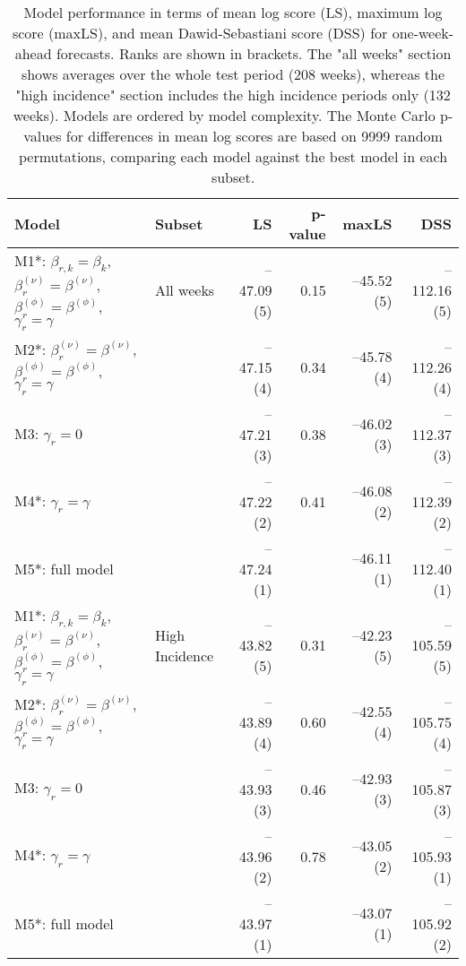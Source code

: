 \begin{table}[ht]
\centering
\begingroup\fontsize{9pt}{10pt}\selectfont
\begin{tabular}{ll|rrrr}
  \hline
Model & Subset & LS & p-value & maxLS & DSS \\ 
  \hline
M1*: $\beta_{r,k} = \beta_{k}$, $\beta_{r}^{(\nu)} = \beta^{(\nu)}$, $\beta_r^{(\phi)} = \beta^{(\phi)}$, $\gamma_r = \gamma$ & All weeks & --47.09 (5) & 0.15 & --45.52 (5) & --112.16 (5) \\ 
  M2*: $\beta_{r}^{(\nu)} = \beta^{(\nu)}$, $\beta_r^{(\phi)} = \beta^{(\phi)}$, $\gamma_r = \gamma$ &  & --47.15 (4) & 0.34 & --45.78 (4) & --112.26 (4) \\ 
  M3: $\gamma_r = 0$ &  & --47.21 (3) & 0.38 & --46.02 (3) & --112.37 (3) \\ 
  M4*: $\gamma_r = \gamma$ &  & --47.22 (2) & 0.41 & --46.08 (2) & --112.39 (2) \\ 
  M5*: full model &  & --47.24 (1) &  & --46.11 (1) & --112.40 (1) \\ 
   \hline
M1*: $\beta_{r,k} = \beta_{k}$, $\beta_{r}^{(\nu)} = \beta^{(\nu)}$, $\beta_r^{(\phi)} = \beta^{(\phi)}$, $\gamma_r = \gamma$ & High Incidence & --43.82 (5) & 0.31 & --42.23 (5) & --105.59 (5) \\ 
  M2*: $\beta_{r}^{(\nu)} = \beta^{(\nu)}$, $\beta_r^{(\phi)} = \beta^{(\phi)}$, $\gamma_r = \gamma$ &  & --43.89 (4) & 0.60 & --42.55 (4) & --105.75 (4) \\ 
  M3: $\gamma_r = 0$ &  & --43.93 (3) & 0.46 & --42.93 (3) & --105.87 (3) \\ 
  M4*: $\gamma_r = \gamma$ &  & --43.96 (2) & 0.78 & --43.05 (2) & --105.93 (1) \\ 
  M5*: full model &  & --43.97 (1) &  & --43.07 (1) & --105.92 (2) \\ 
   \hline
\end{tabular}
\endgroup
\caption{Model performance in terms of mean log score (LS),
             maximum log score (maxLS), and mean Dawid-Sebastiani score (DSS)
             for one-week-ahead forecasts.
             Ranks are shown in brackets.
             The "all weeks" section shows averages over the
             whole test period (208 weeks),
             whereas the "high incidence" section includes
             the high incidence periods only (132 weeks).
             Models are ordered by model complexity.
             The Monte Carlo p-values for differences in mean log scores
             are based on 9999 random permutations,
             comparing each model against the best model in each subset.} 
\label{tab:forecast}
\end{table}
